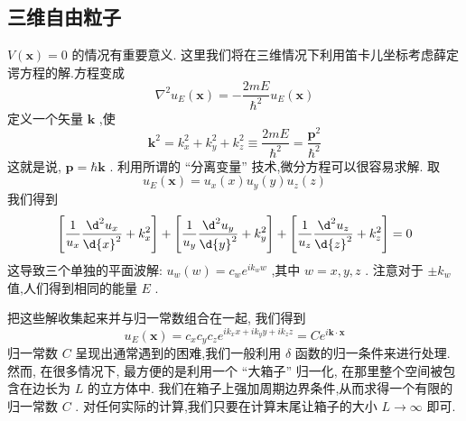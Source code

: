 \subsection{三维自由粒子}
$V\left( \mathbf{x}\right) = 0$ 的情况有重要意义. 这里我们将在三维情况下利用笛卡儿坐标考虑薛定谔方程的解.方程变成
\begin{equation}
{\nabla }^{2}{u}_{E}\left( \mathbf{x}\right) = - \frac{2mE}{{\hbar }^{2}}{u}_{E}\left( \mathbf{x}\right)
\end{equation}
定义一个矢量 $\mathbf{k}$ ,使
\begin{equation}
{\mathbf{k}}^{2} = {k}_{x}^{2} + {k}_{y}^{2} + {k}_{z}^{2} \equiv \frac{2mE}{{\hbar }^{2}} = \frac{{\mathbf{p}}^{2}}{{\hbar }^{2}}
\end{equation}
这就是说, $\mathbf{p} = \hbar \mathbf{k}$ . 利用所谓的 “分离变量” 技术,微分方程可以很容易求解. 取
\begin{equation}
{u}_{E}\left( \mathbf{x}\right) = {u}_{x}\left( x\right) {u}_{y}\left( y\right) {u}_{z}\left( z\right)
\end{equation}
我们得到
\begin{equation}
\left\lbrack {\frac{1}{{u}_{x}}\frac{{\d}^{2}{u}_{x}}{\d {x}^{2}} + {k}_{x}^{2}}\right\rbrack + \left\lbrack {\frac{1}{{u}_{y}}\frac{{\d}^{2}{u}_{y}}{\d{y}^{2}} + {k}_{y}^{2}}\right\rbrack + \left\lbrack {\frac{1}{{u}_{z}}\frac{{\d}^{2}{u}_{z}}{\d{z}^{2}} + {k}_{z}^{2}}\right\rbrack = 0
\end{equation}
这导致三个单独的平面波解: ${u}_{w}\left( w\right) = {c}_{w}{e}^{i{k}_{w}w}$ ,其中 $w = x, y, z$ . 注意对于 $\pm {k}_{w}$ 值,人们得到相同的能量 $E$ .

把这些解收集起来并与归一常数组合在一起, 我们得到
\begin{equation}
{u}_{E}\left( \mathbf{x}\right) = {c}_{x}{c}_{y}{c}_{z}{e}^{i{k}_{x}x + i{k}_{y}y + i{k}_{z}z} = C{e}^{i\mathbf{k} \cdot \mathbf{x}}
\end{equation}
归一常数 $C$ 呈现出通常遇到的困难,我们一般利用 $\delta$ 函数的归一条件来进行处理. 然而, 在很多情况下, 最方便的是利用一个 “大箱子” 归一化, 在那里整个空间被包含在边长为 $L$ 的立方体中. 我们在箱子上强加周期边界条件,从而求得一个有限的归一常数 $C$ . 对任何实际的计算,我们只要在计算末尾让箱子的大小 $L \rightarrow \infty$ 即可.

